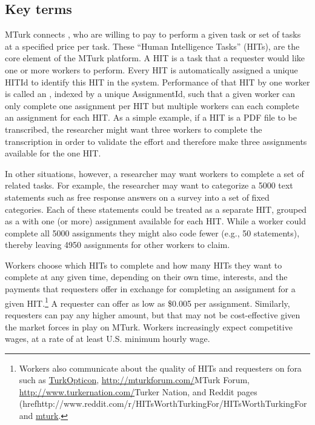 \subsection{Key terms}
MTurk connects , who are willing to pay  to perform a given task or set of tasks at a specified price per task. These ``Human Intelligence Tasks'' (HITs), are the core element of the MTurk platform. A HIT is a task that a requester would like one or more workers to perform. Every HIT is automatically assigned a unique HITId to identify this HIT in the system. Performance of that HIT by one worker is called an , indexed by a unique AssignmentId, such that a given worker can only complete one assignment per HIT but multiple workers can each complete an assignment for each HIT. As a simple example, if a HIT is a PDF file to be transcribed, the researcher might want three workers to complete the transcription in order to validate the effort and therefore make three assignments available for the one HIT.

In other situations, however, a researcher may want workers to complete a set of related tasks. For example, the researcher may want to categorize a 5000 text statements such as free response answers on a survey into a set of fixed categories. Each of these statements could be treated as a separate HIT, grouped as a  with one (or more) assignment available for each HIT. While a worker could complete all 5000 assignments they might also code fewer (e.g., 50 statements), thereby leaving 4950 assignments for other workers to claim.

Workers choose which HITs to complete and how many HITs they want to complete at any given time, depending on their own time, interests, and the payments that requesters offer in exchange for completing an assignment for a given HIT.\footnote{Workers also communicate about the quality of HITs and requesters on fora such as \href{http://turkopticon.differenceengines.com/}{TurkOpticon}, \url{http://mturkforum.com/}{MTurk Forum}, \url{http://www.turkernation.com/}{Turker Nation}, and Reddit pages (href{http://www.reddit.com/r/HITsWorthTurkingFor/}{HITsWorthTurkingFor} and \href{http://www.reddit.com/r/mturk}{mturk}.} A requester can offer as low as \$0.005 per assignment. Similarly, requesters can pay any higher amount, but that may not be cost-effective given the market forces in play on MTurk. Workers increasingly expect competitive wages, at a rate of at least U.S. minimum hourly wage.

